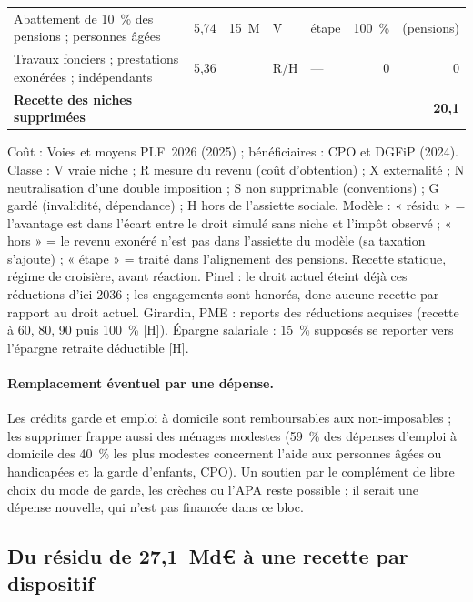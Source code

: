 \begin{table}[h]
\begin{tabular}{p{4.6cm}rrp{0.7cm}p{1.2cm}rr}
Abattement de 10~\% des pensions ; personnes âgées & 5{,}74 & 15~M & V & étape & 100~\% & (pensions) \\
Travaux fonciers ; prestations exonérées ; indépendants & 5{,}36 & & R/H & --- & 0 & 0 \\ \hline
\textbf{Recette des niches supprimées} & & & & & & \textbf{20{,}1} \\ \hline
\end{tabular}
\par\footnotesize Coût : Voies et moyens PLF~2026 (2025) ; bénéficiaires : CPO et DGFiP (2024). Classe : V vraie niche ; R mesure du revenu (coût d'obtention) ; X externalité ; N neutralisation d'une double imposition ; S non supprimable (conventions) ; G gardé (invalidité, dépendance) ; H hors de l'assiette sociale. Modèle : « résidu » = l'avantage est dans l'écart entre le droit simulé sans niche et l'impôt observé ; « hors » = le revenu exonéré n'est pas dans l'assiette du modèle (sa taxation s'ajoute) ; « étape » = traité dans l'alignement des pensions. Recette statique, régime de croisière, avant réaction. Pinel : le droit actuel éteint déjà ces réductions d'ici 2036 ; les engagements sont honorés, donc aucune recette par rapport au droit actuel. Girardin, PME : reports des réductions acquises (recette à 60, 80, 90 puis 100~\% [H]). Épargne salariale : 15~\% supposés se reporter vers l'épargne retraite déductible [H].
\end{table}

\paragraph{Remplacement éventuel par une dépense.} Les crédits garde et emploi à domicile sont remboursables aux non-imposables ; les supprimer frappe aussi des ménages modestes (59~\% des dépenses d'emploi à domicile des 40~\% les plus modestes concernent l'aide aux personnes âgées ou handicapées et la garde d'enfants, CPO). Un soutien par le complément de libre choix du mode de garde, les crèches ou l'APA reste possible ; il serait une dépense nouvelle, qui n'est pas financée dans ce bloc.

\subsection{Du résidu de 27,1~Md€ à une recette par dispositif}\label{ann:ircsg_residu}

